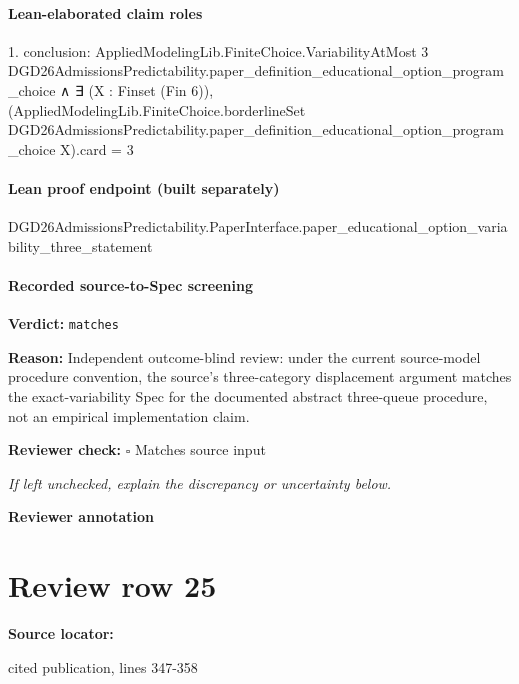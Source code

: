 \documentclass[10pt]{article}
\newcommand{\reviewerbox}{%
  \par\noindent\fbox{\parbox{0.96\linewidth}{\rule{0pt}{0.38in}}}\par
}
\newcommand{\reviewmatch}[1]{%
  \par\noindent\textbf{Reviewer check:} $\square$\; #1\par
  \noindent\emph{If left unchecked, explain the discrepancy or uncertainty below.}\par
}
\begin{document}
\paragraph{Lean-elaborated claim roles}\begin{ReviewVerbatim}
1. conclusion: AppliedModelingLib.FiniteChoice.VariabilityAtMost 3
    DGD26AdmissionsPredictability.paper_definition_educational_option_program_choice ∧
  ∃ (X : Finset (Fin 6)),
    (AppliedModelingLib.FiniteChoice.borderlineSet
          DGD26AdmissionsPredictability.paper_definition_educational_option_program_choice X).card =
      3
\end{ReviewVerbatim}

\paragraph{Lean proof endpoint (built separately)}\begin{ReviewVerbatim}
DGD26AdmissionsPredictability.PaperInterface.paper_educational_option_variability_three_statement
\end{ReviewVerbatim}

\paragraph{Recorded source-to-Spec screening}
\textbf{Verdict:} \texttt{matches}
\\
{\raggedright
\textbf{Reason:} Independent outcome-\allowbreak{}blind review:\allowbreak{} under the current source-\allowbreak{}model procedure convention, the source's three-\allowbreak{}category displacement argument matches the exact-\allowbreak{}variability Spec for the documented abstract three-\allowbreak{}queue procedure, not an empirical implementation claim.\allowbreak{}
\par}
\reviewmatch{Matches source input}
\noindent\textbf{Reviewer annotation}\par
\reviewerbox
\clearpage
\hypertarget{source-claim-a241fbe5321a55d3}{}
\section*{Review row 25}
\textbf{Source locator:} {\footnotesize\raggedright cited publication, lines 347-\allowbreak{}358\par}
\end{document}
